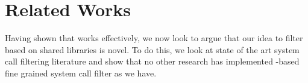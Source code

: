 \section{Related Works}\label{sec:related-works}

Having shown that \af works effectively, we now look to argue that our idea to
filter based on shared libraries is novel. To do this, we look at state of the
art system call filtering literature and show that no other research has
implemented -based fine grained system call filter as we have.

